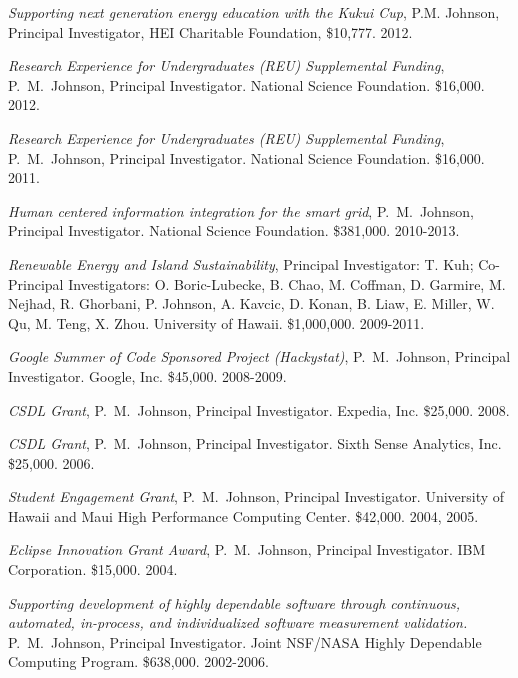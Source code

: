 \begin{Awarded Grant Support}

\item {\em Supporting next generation energy education with the Kukui Cup},
P.M. Johnson, Principal Investigator,
HEI Charitable Foundation, \$10,777. 2012.

\item {\em Research Experience for Undergraduates (REU) Supplemental Funding}, P.~M.~Johnson, Principal Investigator.
  National Science Foundation.
    \$16,000. 2012.

\item {\em Research Experience for Undergraduates (REU) Supplemental Funding}, P.~M.~Johnson, Principal Investigator.
  National Science Foundation.
    \$16,000. 2011.

\item {\em Human centered information integration for the smart grid}, P.~M.~Johnson, Principal Investigator.
  National Science Foundation.
    \$381,000. 2010-2013.

\item {\em Renewable Energy and Island Sustainability}, Principal Investigator: T. Kuh; Co-Principal Investigators:  O. Boric-Lubecke,
B. Chao, M. Coffman, D. Garmire, M. Nejhad, R. Ghorbani, P. Johnson, A. Kavcic, D. Konan, B. Liaw, E. Miller, W. Qu, M. Teng, 
X. Zhou. University of Hawaii. \$1,000,000. 2009-2011.

\item {\em Google Summer of Code Sponsored Project (Hackystat)}, P.~M.~Johnson, Principal Investigator. Google, Inc.  \$45,000. 2008-2009.

\item {\em CSDL Grant}, P.~M.~Johnson, Principal Investigator. Expedia, Inc.  \$25,000. 2008.

\item {\em CSDL Grant}, P.~M.~Johnson, Principal Investigator. Sixth Sense Analytics, Inc.  \$25,000. 2006.

\item {\em Student Engagement Grant}, P.~M.~Johnson, Principal
Investigator. University of Hawaii and Maui High Performance Computing Center.  \$42,000. 2004, 2005.

\item {\em Eclipse Innovation Grant Award}, P.~M.~Johnson, Principal
Investigator.  IBM Corporation. \$15,000. 2004.

\item {\em Supporting development of highly dependable software through
continuous, automated, in-process, and individualized software measurement
validation.}  P.~M.~Johnson, Principal Investigator.  Joint NSF/NASA 
Highly Dependable Computing Program.  \$638,000.  2002-2006.


\end{Awarded Grant Support}
